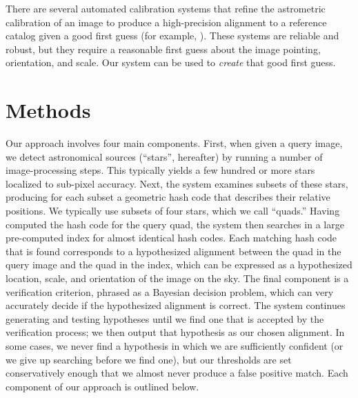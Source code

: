 There are several automated calibration systems that refine the
astrometric calibration of an image to produce a high-precision
alignment to a reference catalog given a good first guess (for
example, \cite{valdes1995, wcstools4, bertin2005}).  These systems are
reliable and robust, but they require a reasonable first guess about
the image pointing, orientation, and scale.  Our system can be used to
\emph{create} that good first guess.




\section{Methods}




Our approach involves four main components.  First, when given a query
image, we detect astronomical sources (``stars'', hereafter) by
running a number of image-processing steps.  This typically yields a
few hundred or more stars localized to sub-pixel accuracy.  Next, the
system examines subsets of these stars, producing for each subset a
geometric hash code that describes their relative positions.  We
typically use subsets of four stars, which we call ``quads.''  Having
computed the hash code for the query quad, the system then searches in
a large pre-computed index for almost identical hash codes.  Each
matching hash code that is found corresponds to a hypothesized
alignment between the quad in the query image and the quad in the
index, which can be expressed as a hypothesized location, scale, and
orientation of the image on the sky.  The final component is a
verification criterion, phrased as a Bayesian decision problem, which
can very accurately decide if the hypothesized alignment is correct.
The system continues generating and testing hypotheses until we find
one that is accepted by the verification process; we then output that
hypothesis as our chosen alignment.  In some cases, we never find a
hypothesis in which we are sufficiently confident (or we give up
searching before we find one), but our thresholds are set
conservatively enough that we almost never produce a false positive
match.  Each component of our approach is outlined below.

